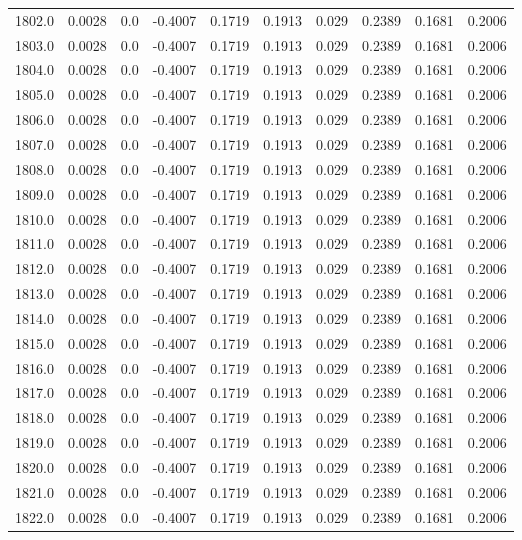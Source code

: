 \begin{longtable}{lrrrrrrrrr}
1802.0 & 0.0028 & 0.0 & -0.4007 & 0.1719 & 0.1913 & 0.029 & 0.2389 & 0.1681 & 0.2006 \\
1803.0 & 0.0028 & 0.0 & -0.4007 & 0.1719 & 0.1913 & 0.029 & 0.2389 & 0.1681 & 0.2006 \\
1804.0 & 0.0028 & 0.0 & -0.4007 & 0.1719 & 0.1913 & 0.029 & 0.2389 & 0.1681 & 0.2006 \\
1805.0 & 0.0028 & 0.0 & -0.4007 & 0.1719 & 0.1913 & 0.029 & 0.2389 & 0.1681 & 0.2006 \\
1806.0 & 0.0028 & 0.0 & -0.4007 & 0.1719 & 0.1913 & 0.029 & 0.2389 & 0.1681 & 0.2006 \\
1807.0 & 0.0028 & 0.0 & -0.4007 & 0.1719 & 0.1913 & 0.029 & 0.2389 & 0.1681 & 0.2006 \\
1808.0 & 0.0028 & 0.0 & -0.4007 & 0.1719 & 0.1913 & 0.029 & 0.2389 & 0.1681 & 0.2006 \\
1809.0 & 0.0028 & 0.0 & -0.4007 & 0.1719 & 0.1913 & 0.029 & 0.2389 & 0.1681 & 0.2006 \\
1810.0 & 0.0028 & 0.0 & -0.4007 & 0.1719 & 0.1913 & 0.029 & 0.2389 & 0.1681 & 0.2006 \\
1811.0 & 0.0028 & 0.0 & -0.4007 & 0.1719 & 0.1913 & 0.029 & 0.2389 & 0.1681 & 0.2006 \\
1812.0 & 0.0028 & 0.0 & -0.4007 & 0.1719 & 0.1913 & 0.029 & 0.2389 & 0.1681 & 0.2006 \\
1813.0 & 0.0028 & 0.0 & -0.4007 & 0.1719 & 0.1913 & 0.029 & 0.2389 & 0.1681 & 0.2006 \\
1814.0 & 0.0028 & 0.0 & -0.4007 & 0.1719 & 0.1913 & 0.029 & 0.2389 & 0.1681 & 0.2006 \\
1815.0 & 0.0028 & 0.0 & -0.4007 & 0.1719 & 0.1913 & 0.029 & 0.2389 & 0.1681 & 0.2006 \\
1816.0 & 0.0028 & 0.0 & -0.4007 & 0.1719 & 0.1913 & 0.029 & 0.2389 & 0.1681 & 0.2006 \\
1817.0 & 0.0028 & 0.0 & -0.4007 & 0.1719 & 0.1913 & 0.029 & 0.2389 & 0.1681 & 0.2006 \\
1818.0 & 0.0028 & 0.0 & -0.4007 & 0.1719 & 0.1913 & 0.029 & 0.2389 & 0.1681 & 0.2006 \\
1819.0 & 0.0028 & 0.0 & -0.4007 & 0.1719 & 0.1913 & 0.029 & 0.2389 & 0.1681 & 0.2006 \\
1820.0 & 0.0028 & 0.0 & -0.4007 & 0.1719 & 0.1913 & 0.029 & 0.2389 & 0.1681 & 0.2006 \\
1821.0 & 0.0028 & 0.0 & -0.4007 & 0.1719 & 0.1913 & 0.029 & 0.2389 & 0.1681 & 0.2006 \\
1822.0 & 0.0028 & 0.0 & -0.4007 & 0.1719 & 0.1913 & 0.029 & 0.2389 & 0.1681 & 0.2006 \\

\end{longtable}
